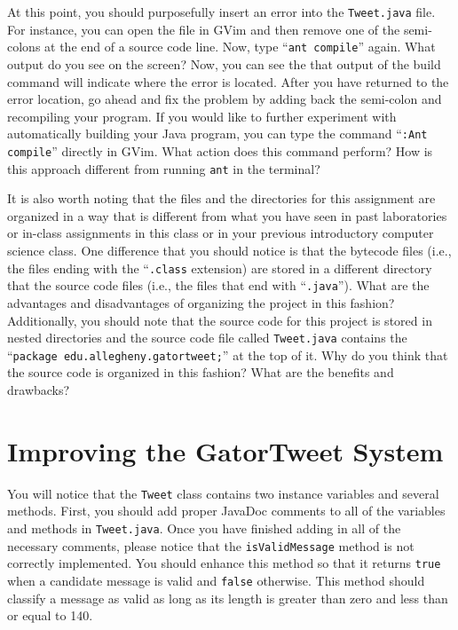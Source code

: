   At this point, you should purposefully insert an error into the {\tt Tweet.java} file.  For instance, you can open the
  file in GVim and then remove one of the semi-colons at the end of a source code line. Now, type ``{\tt ant compile}''
  again.  What output do you see on the screen? Now, you can see the that output of the build command will indicate
  where the error is located. After you have returned to the error location, go ahead and fix the
  problem by adding back the semi-colon and recompiling your program. If you would like to further experiment with
  automatically building your Java program, you can type the command ``{\tt :Ant compile}'' directly in GVim. What
  action does this command perform? How is this approach different from running {\tt ant} in the terminal?

  It is also worth noting that the files and the directories for this assignment are organized in a way that is
  different from what you have seen in past laboratories or in-class assignments in this class or in your previous
  introductory computer science class. One difference that you should notice is that the bytecode files (i.e., the files
    ending with the ``{\tt .class} extension) are stored in a different directory that the source code files (i.e., the
  files that end with ``{\tt .java}''). What are the advantages and disadvantages of organizing the project in this
  fashion? Additionally, you should note that the source code for this project is stored in nested directories and the
  source code file called {\tt Tweet.java} contains the ``{\tt package edu.allegheny.gatortweet;}'' at the top of it.
  Why do you think that the source code is organized in this fashion? What are the benefits and drawbacks?

\section*{Improving the GatorTweet System}

  You will notice that the {\tt Tweet} class contains two instance variables and several methods.  First, you should add
  proper JavaDoc comments to all of the variables and methods in {\tt Tweet.java}.  Once you have finished adding in all
  of the necessary comments, please notice that the {\tt isValidMessage} method is not correctly implemented.  You
  should enhance this method so that it returns {\tt true} when a candidate message is valid and {\tt false} otherwise.
  This method should classify a message as valid as long as its length is greater than zero and less than or equal to
  140.

